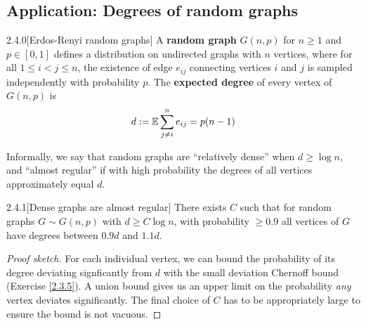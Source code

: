 {\newpage
\subsection{Application: Degrees of random graphs} %

\begin{defn}{2.4.0}[Erdos-Renyi random graphs]\label{2.4.0}
A \textbf{random graph} $G(n,p)$ for $n\geq 1$ and $p \in [0,1]$ defines a distribution on undirected graphs with $n$ vertices, where for all $1 \leq i < j \leq n$, the existence of edge $e_{ij}$ connecting vertices $i$ and $j$ is sampled independently with probability $p$. The \textbf{expected degree} of every vertex of $G(n,p)$ is
\begin{align*}
    d := \mathbb{E} \sum_{j\neq i}^n e_{ij} = p(n-1)
\end{align*}
\end{defn}

Informally, we say that random graphs are ``relatively dense'' when $d\geq \log n$, and ``almost regular'' if with high probability the degrees of all vertices approximately equal $d$.

\begin{prop}{2.4.1}[Dense graphs are almost regular]\label{2.4.1}
There exists $C$ such that for random graphs $G \sim G(n,p)$ with $d \geq C\log n$, with probability $\geq 0.9$ all vertices of $G$ have degrees between $0.9d$ and $1.1d$.
\end{prop}
\begin{proof}[Proof sketch]
For each individual vertex, we can bound the probability of its degree deviating signficantly from $d$ with the small deviation Chernoff bound (Exercise \ref{2.3.5}). A union bound gives us an upper limit on the probability \textit{any} vertex deviates significantly. The final choice of $C$ has to be appropriately large to ensure the bound is not vacuous.
\end{proof}

}
